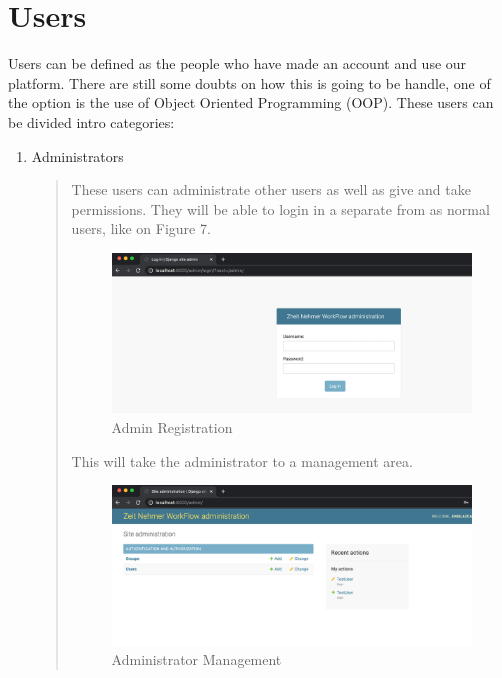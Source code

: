 \documentclass{article}[draft]
\begin{document}
\section{Users}
  Users can be defined as the people who have made an account and use our platform. There are still some doubts on how this is going to be handle, one of the option is the use of Object Oriented Programming (OOP). These users can be divided intro categories:
  \begin{enumerate}
    \item Administrators
    \begin{quote}
        These users can administrate other users as well as give and take permissions. They will be able to login in a separate from as normal users, like on Figure 7.
        \begin{figure}[h!]
            \centering
            \includegraphics[scale=0.75]{Images/adminLogin.png}
            \caption{Admin Registration}
            \label{fig:figure 5}
        \end{figure}

        \vspace{160}

        This will take the administrator to a management area.

        \begin{figure}[h!]
            \centering
            \includegraphics[scale=0.75]{Images/adminManage.png}
            \caption{Administrator Management}
            \label{fig:figure 6}
        \end{figure}




\end{quote}
\end{enumerate}
\end{document}
